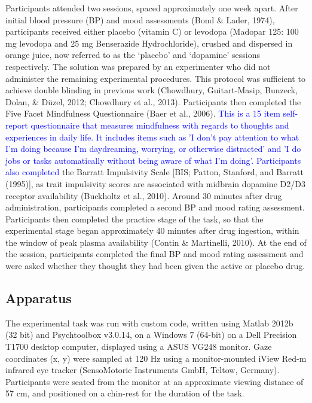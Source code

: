 \documentclass[
  man]{apa6}
\begin{document}
Participants attended two sessions, spaced approximately one week apart. After initial blood pressure (BP) and mood assessments (Bond \& Lader, 1974), participants received either placebo (vitamin C) or levodopa (Madopar 125: 100 mg levodopa and 25 mg Benserazide Hydrochloride), crushed and dispersed in orange juice, now referred to as the `placebo' and `dopamine' sessions respectively. The solution was prepared by an experimenter who did not administer the remaining experimental procedures. This protocol was sufficient to achieve double blinding in previous work (Chowdhury, Guitart-Masip, Bunzeck, Dolan, \& Düzel, 2012; Chowdhury et al., 2013). Participants then completed the Five Facet Mindfulness Questionnaire (Baer et al., 2006). \textcolor{blue}{This is a 15 item self-report questionnaire that measures mindfulness with regards to thoughts and experiences in daily life. It includes items such as 'I don't pay attention to what I'm doing because I'm daydreaming, worrying, or otherwise distracted' and 'I do jobs or tasks automatically without being aware of what I'm doing'. Participants also completed} the Barratt Impulsivity Scale {[}BIS; Patton, Stanford, and Barratt (1995){]}, as trait impulsivity scores are associated with midbrain dopamine D2/D3 receptor availability (Buckholtz et al., 2010). Around 30 minutes after drug administration, participants completed a second BP and mood rating assessment. Participants then completed the practice stage of the task, so that the experimental stage began approximately 40 minutes after drug ingestion, within the window of peak plasma availability (Contin \& Martinelli, 2010). At the end of the session, participants completed the final BP and mood rating assessment and were asked whether they thought they had been given the active or placebo drug.

\hypertarget{apparatus}{%
\subsection{Apparatus}\label{apparatus}}

\label{sec:Apparatus}

The experimental task was run with custom code, written using Matlab 2012b (32 bit) and Psychtoolbox v3.0.14, on a Windows 7 (64-bit) on a Dell Precision T1700 desktop computer, displayed using a ASUS VG248 monitor. Gaze coordinates (x, y) were sampled at 120 Hz using a monitor-mounted iView Red-m infrared eye tracker (SensoMotoric Instruments GmbH, Teltow, Germany). Participants were seated from the monitor at an approximate viewing distance of 57 cm, and positioned on a chin-rest for the duration of the task.
\end{document}
